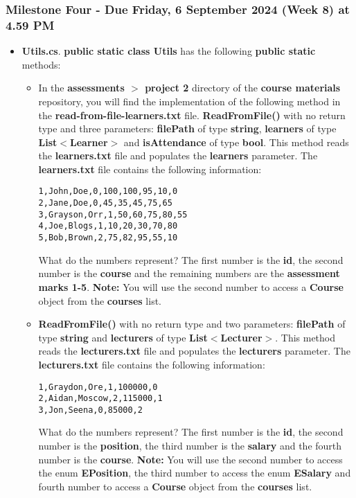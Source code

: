\documentclass{article}
\begin{document}
\subsubsection*{Milestone Four - Due Friday, 6 September 2024 (Week 8) at 4.59 PM}

\begin{itemize}
    \item \textbf{Utils.cs}. \textbf{public static class Utils} has the following \textbf{public static} methods:
        \begin{itemize}
            \item In the \textbf{assessments $>$ project 2} directory of the \textbf{course materials} repository, you will find the implementation of the following method in the \textbf{read-from-file-learners.txt} file.
            \textbf{ReadFromFile()} with no return type and three parameters: \textbf{filePath} of type \textbf{string}, \textbf{learners} of type \textbf{List$<$Learner$>$} and \textbf{isAttendance} of type \textbf{bool}. This method reads the \textbf{learners.txt} file and populates the \textbf{learners} parameter. The \textbf{learners.txt} file contains the following information:\\
            \begin{verbatim}
1,John,Doe,0,100,100,95,10,0
2,Jane,Doe,0,45,35,45,75,65
3,Grayson,Orr,1,50,60,75,80,55
4,Joe,Blogs,1,10,20,30,70,80
5,Bob,Brown,2,75,82,95,55,10
            \end{verbatim}
            What do the numbers represent? The first number is the \textbf{id}, the second number is the \textbf{course} and the remaining numbers are the \textbf{assessment marks 1-5}. \textbf{Note:} You will use the second number to access a \textbf{Course} object from the \textbf{courses} list.
        \item \textbf{ReadFromFile()} with no return type and two parameters: \textbf{filePath} of type \textbf{string} and \textbf{lecturers} of type \textbf{List$<$Lecturer$>$}. This method reads the \textbf{lecturers.txt} file and populates the \textbf{lecturers} parameter. The \textbf{lecturers.txt} file contains the following information:\\
        \begin{verbatim}
1,Graydon,Ore,1,100000,0
2,Aidan,Moscow,2,115000,1
3,Jon,Seena,0,85000,2
        \end{verbatim}
        What do the numbers represent? The first number is the \textbf{id}, the second number is the \textbf{position}, the third number is the \textbf{salary} and the fourth number is the \textbf{course}. \textbf{Note:} You will use the second number to access the enum \textbf{EPosition}, the third number to access the enum \textbf{ESalary} and fourth number to access a \textbf{Course} object from the \textbf{courses} list.
    \end{itemize}
\end{itemize}
\end{document}
